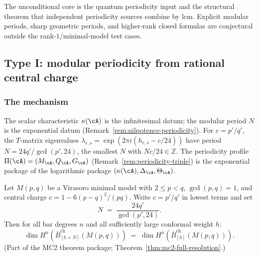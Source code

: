 \begin{remark}\label{rem:periodicity-scope}
The unconditional core is the quantum periodicity input and the
structural theorem that independent periodicity sources combine by lcm.
Explicit modular periods, sharp geometric periods, and higher-rank
closed formulas are conjectural outside the rank-$1$/minimal-model test
cases.
\end{remark}

\subsection{Type I: modular periodicity from rational central charge}

\subsubsection{The mechanism}

\begin{remark}
\label{rem:periodicity-as-exponential}
The scalar characteristic $\kappa(\cA)$ is the infinitesimal datum; the modular period $N$ is the exponential datum (Remark~\ref{rem:nilpotence-periodicity}).  For $c = p'/q'$, the $T$-matrix eigenvalues $\lambda_{r,s} = \exp(2\pi i(h_{r,s} - c/24))$ have period $N = 24q'/\gcd(p',24)$, the smallest $N$ with $Nc/24 \in \mathbb{Z}$.  The periodicity profile $\Pi(\cA) = (M_\cA, Q_\cA, G_\cA)$ (Remark~\ref{rem:periodicity-triple}) is the exponential package of the logarithmic package $(\kappa(\cA), \Delta_\cA, \Theta_\cA)$.
\end{remark}

\begin{conjecture}
\label{conj:modular-periodicity-minimal}
Let $M(p,q)$ be a Virasoro minimal model with $2 \leq p < q$, $\gcd(p,q) = 1$,
and central charge $c = 1 - 6(p-q)^2/(pq)$.  Write $c = p'/q'$ in lowest terms
and set
\[
N \;=\; \frac{24q'}{\gcd(p',24)}.
\]
Then for all bar degrees $n$ and all sufficiently large conformal weight $h$:
\[
\dim H^n(\bar{B}_{[h+N]}^{\mathrm{ch}}(M(p,q)))
\;=\;
\dim H^n(\bar{B}_{[h]}^{\mathrm{ch}}(M(p,q))).
\]
(Part of the MC2 theorem package; Theorem~\ref{thm:mc2-full-resolution}.)
\end{conjecture}

